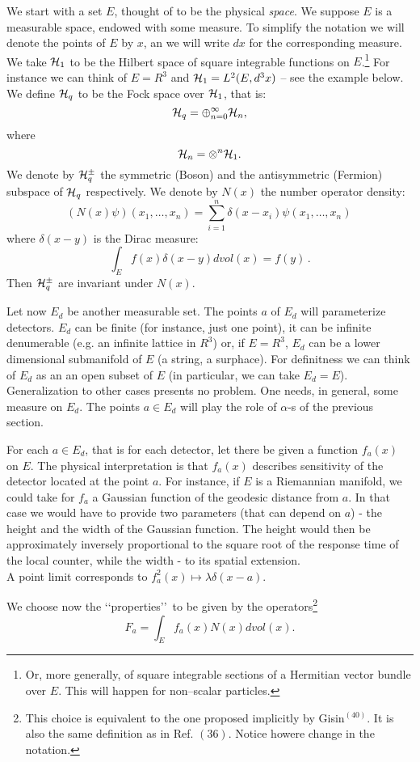 \documentclass[12pt]{article}
\def\hq{{\cal H}_q}
\def\be{\begin{equation}}
\def\ee{\end{equation}}
\def\lqq{\lq\lq}
\def\rqq{\rq\rq}
\begin{document}
We start with a set $E$, thought of to be the physical {\sl space}. We
suppose $E$ is a measurable space, endowed with some measure. To
simplify the notation we will denote the points of $E$ by $x$, an we
will write $dx$ for the corresponding measure. We take ${\cal H}_1$ to
be the Hilbert space of square integrable functions on $E$.\footnote{Or,
more generally, of square integrable sections of a Hermitian vector
bundle over $E$. This will happen for non--scalar particles.} For
instance we can think of $E=R^3$ and ${\cal H}_1=L^2(E,d^3x)$ -- see the
example below. We define $\hq$ to be the Fock space over ${\cal H}_1$,
that is:
\be \hq = \oplus_{n=0}^\infty {\cal H}_n,
\ee
where
\be
{\cal H}_n=\otimes^n {\cal H}_1.
\ee
We denote by $\hq^{\pm}$ the symmetric (Boson) and the antisymmetric
(Fermion) subspace of $\hq$ respectively. We denote by $N(x)$ the number
operator density:
\be
\left(N(x)\psi\right)(x_1,\ldots ,x_n)=\sum_{i=1}^n\delta(x-x_i)
\psi(x_1,\ldots ,x_n)\,
\ee
where $\delta(x-y)$ is the Dirac measure:
$$\int_E f(x)\delta(x-y) dvol(x)=f(y)\, .$$
Then $\hq^{\pm}$ are invariant under $N(x)$.

Let now $E_d$ be another measurable set. The points $a$ of $E_d$ will
parameterize detectors. $E_d$ can be finite (for instance, just one
point), it can be infinite denumerable (e.g. an infinite lattice in
$R^3$) or, if $E=R^3$, $E_d$ can be a lower dimensional submanifold of
$E$ (a string, a surphace). For definitness we can think of $E_d$
as an an open subset of $E$ (in particular, we can take $E_d=E$).
Generalization to other cases presents no problem. One needs, in
general, some measure on $E_d$. The points $a\in E_d$ will play the
role of $\alpha$-s of the previous section.

For each $a\in E_d$, that is for each detector, let there be given a
function $f_a(x)$ on $E$. The physical interpretation is that $f_a(x)$
describes sensitivity of the detector located at the point $a$. For
instance, if $E$ is a Riemannian manifold, we could take for $f_a$ a
Gaussian function of the geodesic distance from $a$. In that case we
would have to provide two parameters (that can depend on $a$) - the
height and the width of the Gaussian function. The height would then be
approximately inversely proportional to the square root of the response
time of the local counter, while the width - to its spatial extension.\\
A point limit corresponds to $f_a^2(x)\mapsto \lambda\delta(x-a)$.

We choose now the \lqq properties\rqq\,  to be given by the
operators\footnote{This choice is equivalent to the one proposed
implicitly by Gisin$^{(40)}$. It is also the same definition as in Ref.
${(36)}$. Notice
howere change in the notation.}
\be F_a=\int_E f_a(x)N(x)dvol(x).
\ee
\end{document}
